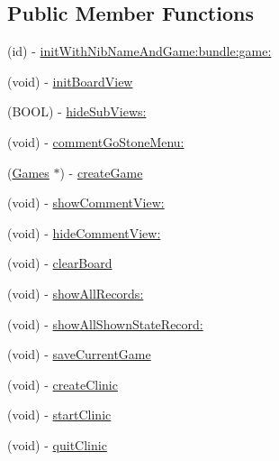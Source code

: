 \subsection*{Public Member Functions}
\begin{DoxyCompactItemize}
\item 
(id) -\/ \hyperlink{interface_abstract_record_view_controller_a1b7e23969bdfd31a40bcb96a3ace9db4}{initWithNibNameAndGame:bundle:game:}
\item 
(void) -\/ \hyperlink{interface_abstract_record_view_controller_a439cd9960b3b729fe932df6201d913a1}{initBoardView}
\item 
(BOOL) -\/ \hyperlink{interface_abstract_record_view_controller_a5c1ebc2a0be8d378f5c7f58552575896}{hideSubViews:}
\item 
(void) -\/ \hyperlink{interface_abstract_record_view_controller_a160875d6c608a4c35496f671bf8cd8ec}{commentGoStoneMenu:}
\item 
(\hyperlink{interface_games}{Games} $\ast$) -\/ \hyperlink{interface_abstract_record_view_controller_aa813c99049d9925edc590cc79199da5e}{createGame}
\item 
(void) -\/ \hyperlink{interface_abstract_record_view_controller_a82e716f77a003cef242f02a887a5aff3}{showCommentView:}
\item 
(void) -\/ \hyperlink{interface_abstract_record_view_controller_a407cf65034096ae1bb6bf44cefc9ca96}{hideCommentView:}
\item 
(void) -\/ \hyperlink{interface_abstract_record_view_controller_acd374d785ed58c9565c66d387e16f603}{clearBoard}
\item 
(void) -\/ \hyperlink{interface_abstract_record_view_controller_a056d70c4b20510d4e7a01afe8969085a}{showAllRecords:}
\item 
(void) -\/ \hyperlink{interface_abstract_record_view_controller_abc8815827d934556ad4b0345653b50e8}{showAllShownStateRecord:}
\item 
(void) -\/ \hyperlink{interface_abstract_record_view_controller_a6ac797433b51ead28bcad34f1ca007b3}{saveCurrentGame}
\item 
(void) -\/ \hyperlink{interface_abstract_record_view_controller_abe8bb5ed1cfb1af0ca755e7702446ea2}{createClinic}
\item 
(void) -\/ \hyperlink{interface_abstract_record_view_controller_a1589a47a882f689e4c8f9976324e4da8}{startClinic}
\item 
(void) -\/ \hyperlink{interface_abstract_record_view_controller_ad37011cf2b9be26303a0a9273df90046}{quitClinic}
\item 

\end{DoxyCompactItemize}
